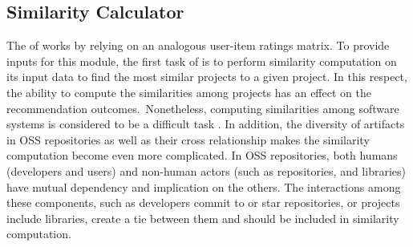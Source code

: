 



\subsection{Similarity Calculator} \label{sec:SimilarityCalculator}

The  of \CT works by relying on an analogous user-item ratings matrix. To provide 
inputs for this module, the first task of \CT is to perform similarity computation on its input data to find the 
most similar projects to a given project. In this respect, the ability to compute the similarities among projects has 
an effect on the recommendation outcomes.~Nonetheless, computing similarities among software systems is considered to 
be a difficult task \cite{McMillan:2012:DSS:2337223.2337267}. In addition, the diversity of artifacts in OSS 
repositories as well as their cross relationship makes the similarity computation become even more complicated. In OSS 
repositories, both humans (\ie developers and users) and non-human actors (such as repositories, and libraries) have 
mutual dependency and implication on the others. The interactions among these components, such as developers commit to 
or star repositories, or projects include libraries, create a tie between them and should be included in similarity 
computation.


